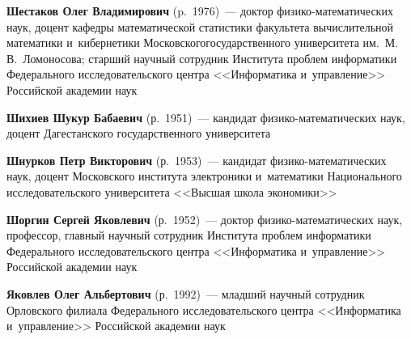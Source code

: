 \begin{multicols}{2}
\vspace*{3pt}

\noindent
\textbf{Шестаков Олег Владимирович} (p.\ 1976)~--- 
доктор фи\-зи\-ко-ма\-те\-ма\-ти\-че\-ских наук, 
доцент кафедры матема\-тической статистики факультета 
вычислительной математики и~кибернетики Московского\linebreak государственного 
университета им.\ М.\,В.~Ло\-мо\-носова; старший научный сотрудник Института проб\-лем 
информатики Федерального исследовательского центра <<Информатика и~управ\-ле\-ние>>
Российской академии наук

\vspace*{3pt}

\noindent
\textbf{Шихиев Шукур Бабаевич} (р.\ 1951)~--- 
кандидат фи\-зи\-ко-ма\-те\-ма\-ти\-че\-ских наук, доцент 
Дагестанского государственного университета

\vspace*{3pt}

\noindent
\textbf{Шнурков Петр Викторович} (р.\ 1953)~--- 
кандидат фи\-зи\-ко-ма\-те\-ма\-ти\-че\-ских наук, доцент Московского
института электроники и~математики 
Национального 
исследовательского университета <<Высшая школа экономики>>

\vspace*{3pt}

\noindent
\textbf{Шоргин Сергей Яковлевич} (р.\ 1952)~--- 
доктор фи\-зи\-ко-ма\-те\-ма\-ти\-че\-ских наук, профессор, глав\-ный научный 
со\-труд\-ник Института проб\-лем информатики Федерального исследовательского центра 
<<Информатика и~управ\-ле\-ние>> Российской академии наук

\vspace*{3pt}

\noindent
\textbf{Яковлев Олег Альбертович} (р.\ 1992)~--- 
младший научный сотрудник Орловского филиала Федерального исследовательского цент\-ра 
<<Информатика и~управ\-ле\-ние>> Российской академии наук








 



 \label{end\stat}






\end{multicols}

\newpage